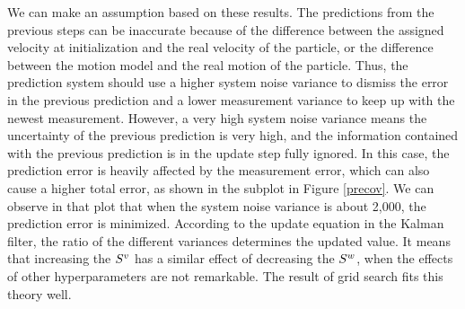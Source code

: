 We can make an assumption based on these results. The predictions from the previous steps can be inaccurate because of the difference between the assigned velocity at initialization and the real velocity of the particle, or the difference between the motion model and the real motion of the particle. Thus, the prediction system should use a higher system noise variance to dismiss the error in the previous prediction and a lower measurement variance to keep up with the newest measurement. However, a very high system noise variance means the uncertainty of the previous prediction is very high, and the information contained with the previous prediction is in the update step fully ignored. In this case, the prediction error is heavily affected by the measurement error, which can also cause a higher total error, as shown in the subplot in Figure \ref{precov}. We can observe in that plot that when the system noise variance is about 2,000, the prediction error is minimized. According to the update equation in the Kalman filter, the ratio of the different variances determines the updated value. It means that increasing the $S^{\boldmath{v}}$ has a similar effect of decreasing the $S^{\boldmath{w}}$, when the effects of other hyperparameters are not remarkable. The result of grid search fits this theory well.



